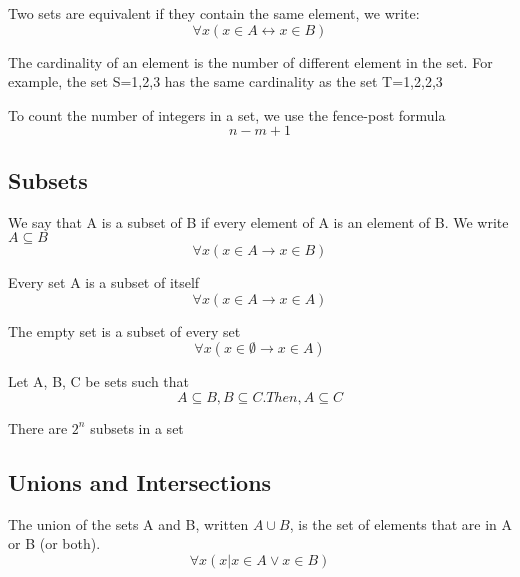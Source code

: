\documentclass{article}
\begin{document}
\begin{definition}
Two sets are equivalent if they contain the same element, we write:
$$ \forall x(x \in A \leftrightarrow x \in B) $$
\end{definition}

\begin{definition}[Cardinality]
The cardinality of an element is the number of different element in the set. For
example, the set S={1,2,3} has the same cardinality as the set T={1,2,2,3}
\end{definition}

\begin{theorem}
To count the number of integers in a set, we use the fence-post formula
$$ n - m + 1 $$
\end{theorem}

\subsection{Subsets}

\begin{definition}[Subset]
We say that A is a subset of B if every element of A is an element of B. We write
\( A \subseteq B\)
$$ \forall x(x \in A \rightarrow x \in B) $$
\end{definition}

\begin{theorem}
Every set A is a subset of itself
$$ \forall x(x \in A \rightarrow x \in A) $$
\end{theorem}

\begin{theorem}
    The empty set is a subset of every set
    $$ \forall x(x \in \emptyset \rightarrow x \in A) $$
\end{theorem}

\begin{theorem}
Let A, B, C be sets such that $$ A \subseteq B, B \subseteq C. Then, A \subseteq C $$
\end{theorem}

\begin{theorem}
    There are \(2^n\) subsets in a set
\end{theorem}

\subsection{Unions and Intersections}

\begin{definition}[Union]
    The union of the sets A and B, written \(A \cup B\), is the set of elements that
    are in A or B (or both).
    $$ \forall x(x | x \in A \lor x \in B) $$
\end{definition}
\end{document}
